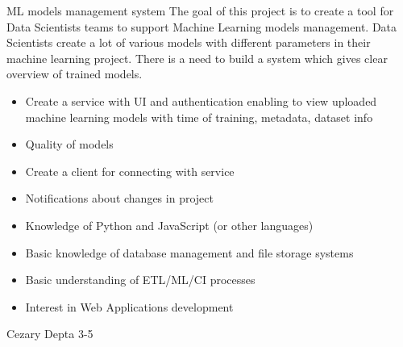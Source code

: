 \begin{project}
{ML models management system}
{
The goal of this project is to create a tool for Data Scientists teams to support Machine Learning models management. Data Scientists create a lot of various models with different parameters in their machine learning project. There is a need to build a system which gives clear overview of trained models.
}
{
\begin{itemize}
	\item Create a service with UI and authentication enabling to view uploaded machine learning models with time of training, metadata, dataset info
	\item Quality of models
	\item Create a client for connecting with service
	\item Notifications about changes in project
\end{itemize}
}
{
\begin{itemize}
	\item Knowledge of Python and JavaScript (or other languages)
	\item Basic knowledge of database management and file storage systems
	\item Basic understanding of ETL/ML/CI processes
	\item Interest in Web Applications development
\end{itemize}
}
{Cezary Depta}
{3-5}
\end{project}
